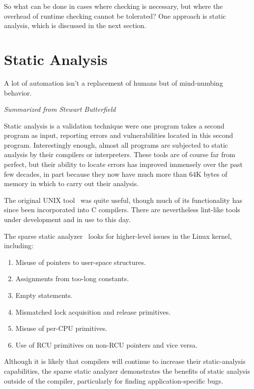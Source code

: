 So what can be done in cases where checking is necessary, but where the
overhead of runtime checking cannot be tolerated?
One approach is static analysis, which is discussed in the next section.

\section{Static Analysis}
\label{sec:debugging:Static Analysis}
%
\epigraph{A lot of automation isn't a replacement of
	  humans but of mind-numbing behavior.}
	 {\emph{Summarized from Stewart Butterfield}}

Static analysis is a validation technique were one program takes a second
program as input, reporting errors and vulnerabilities located in this
second program.
Interestingly enough, almost all programs are subjected to static analysis
by their compilers or interpreters.
These tools are of course far from perfect, but their ability to locate
errors has improved immensely over the past few decades, in part because
they now have much more than 64K bytes of memory in which to carry out their
analysis.

The original UNIX  tool~\cite{StephenJohnson1977lint} was
quite useful, though much of its functionality has since been incorporated
into C compilers.
There are nevertheless lint-like tools under development and in use to
this day.

The sparse static analyzer~\cite{JonathanCorbet2004sparse}
looks for higher-level issues in the Linux kernel, including:

\begin{enumerate}
\item	Misuse of pointers to user-space structures.
\item	Assignments from too-long constants.
\item	Empty  statements.
\item	Mismatched lock acquisition and release primitives.
\item	Misuse of per-CPU primitives.
\item	Use of RCU primitives on non-RCU pointers and vice versa.
\end{enumerate}

Although it is likely that compilers will continue to increase their
static-analysis capabilities, the sparse static analyzer demonstrates
the benefits of static analysis outside of the compiler, particularly
for finding application-specific bugs.


